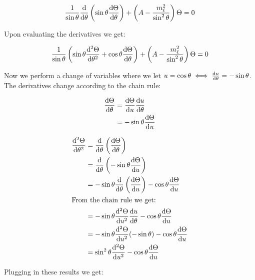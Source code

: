 \documentclass{article}
\begin{document}
    \begin{equation}
        \frac{1}{\sin\theta}\odv{}{\theta}\left( \sin\theta\odv{\Theta}{\theta} \right) + \left( A - \frac{m_{\ell}^2}{\sin^2\theta} \right)\Theta = 0
    \end{equation}

    Upon evaluating the derivatives we get:

    \begin{equation}
        \frac{1}{\sin\theta}\left(\sin\theta\odv[order=2]{\Theta}{\theta} + \cos\theta\odv{\Theta}{\theta}\right) + \left( A - \frac{m_{\ell}^2}{\sin^2\theta} \right)\Theta = 0
    \end{equation}

    Now we perform a change of variables where we let $u = \cos\theta \iff \odv{u}{\theta} = -\sin\theta$. The derivatives change according to the chain rule:

    \begin{align}
        \odv{\Theta}{\theta} &= \odv{\Theta}{u}\odv{u}{\theta} \\
                             &= -\sin\theta\odv{\Theta}{u}
    \end{align}

    \begin{align}
        \odv[order = 2]{\Theta}{\theta} &= \odv{}{\theta}\left( \odv{\Theta}{\theta} \right) \\
                                        &= \odv{}{\theta}\left( -\sin\theta\odv{\Theta}{u} \right) \\
                                        &= -\sin\theta\odv{}{\theta}\left( \odv{\Theta}{u} \right) - \cos\theta\odv{\Theta}{u} \\
                                        \intertext{From the chain rule we get:}
                                        &= -\sin\theta \odv[order = 2]{\Theta}{u}\odv{u}{\theta} - \cos\theta\odv{\Theta}{u} \\
                                        &= -\sin\theta \odv[order = 2]{\Theta}{u}(-\sin\theta) - \cos\theta\odv{\Theta}{u} \\
                                        &= \sin^2\theta \odv[order = 2]{\Theta}{u} - \cos\theta\odv{\Theta}{u}
    \end{align}

    Plugging in these results we get:
\end{document}
